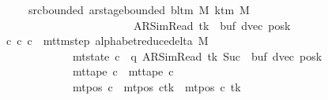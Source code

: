 \begin{isabellebody}
\ \ \ \ \ \ \ src{\isacharunderscore}{\kern0pt}bounded{\isacharcolon}{\kern0pt}\ {\isachardoublequoteopen}ar{\isacharunderscore}{\kern0pt}stage{\isacharunderscore}{\kern0pt}bounded\ {\isacharparenleft}{\kern0pt}bl{\isacharunderscore}{\kern0pt}tm\ M{\isacharparenright}{\kern0pt}\ {\isacharparenleft}{\kern0pt}k{\isacharunderscore}{\kern0pt}tm\ M{\isacharparenright}{\kern0pt}\isanewline
\ \ \ \ \ \ \ \ \ \ \ \ \ \ \ \ \ \ \ \ \ \ \ \ \ \ {\isacharparenleft}{\kern0pt}AR{\isacharunderscore}{\kern0pt}SimRead{\isacharcomma}{\kern0pt}\ tk{\isacharcomma}{\kern0pt}\ {}{\isacharcomma}{\kern0pt}\ buf{\isacharcomma}{\kern0pt}\ dvec{\isacharcomma}{\kern0pt}\ posk{\isacharparenright}{\kern0pt}{\isachardoublequoteclose}\isanewline
\ \ \ {\isachardoublequoteopen}{\isasymexists}c{\isacharprime}{\kern0pt}{\isacharprime}{\kern0pt}{\isachardot}{\kern0pt}\ {\isacharparenleft}{\kern0pt}c{\isacharprime}{\kern0pt}{\isacharcomma}{\kern0pt}\ c{\isacharprime}{\kern0pt}{\isacharprime}{\kern0pt}{\isacharparenright}{\kern0pt}\ {\isasymin}\ mttm{\isacharunderscore}{\kern0pt}step\ {\isacharparenleft}{\kern0pt}alphabet{\isacharunderscore}{\kern0pt}reduce{\isacharunderscore}{\kern0pt}delta\ M{\isacharparenright}{\kern0pt}\isanewline
\ \ \ \ \ \ \ \ \ \ \ \ \ \ {\isasymand}\ mt{\isacharunderscore}{\kern0pt}state\ c{\isacharprime}{\kern0pt}{\isacharprime}{\kern0pt}\ {\isacharequal}{\kern0pt}\ {\isacharparenleft}{\kern0pt}q{\isacharcomma}{\kern0pt}\ AR{\isacharunderscore}{\kern0pt}SimRead{\isacharcomma}{\kern0pt}\ tk{\isacharcomma}{\kern0pt}\ Suc\ {}{\isacharcomma}{\kern0pt}\ buf{\isacharcomma}{\kern0pt}\ dvec{\isacharcomma}{\kern0pt}\ posk{\isacharparenright}{\kern0pt}\isanewline
\ \ \ \ \ \ \ \ \ \ \ \ \ \ {\isasymand}\ mt{\isacharunderscore}{\kern0pt}tape\ c{\isacharprime}{\kern0pt}{\isacharprime}{\kern0pt}\ {\isacharequal}{\kern0pt}\ mt{\isacharunderscore}{\kern0pt}tape\ c{\isacharprime}{\kern0pt}\isanewline
\ \ \ \ \ \ \ \ \ \ \ \ \ \ {\isasymand}\ mt{\isacharunderscore}{\kern0pt}pos\ c{\isacharprime}{\kern0pt}{\isacharprime}{\kern0pt}\ {\isacharequal}{\kern0pt}\ {\isacharparenleft}{\kern0pt}mt{\isacharunderscore}{\kern0pt}pos\ c{\isacharprime}{\kern0pt}{\isacharparenright}{\kern0pt}{\isacharparenleft}{\kern0pt}tk\ {\isacharcolon}{\kern0pt}{\isacharequal}{\kern0pt}\ mt{\isacharunderscore}{\kern0pt}pos\ c{\isacharprime}{\kern0pt}\ tk\ {\isacharminus}{\kern0pt}\ {}{\isacharparenright}{\kern0pt}{\isachardoublequoteclose}\isanewline
%
\isadelimproof
%
\endisadelimproof
%
\isatagproof
{}\isamarkupfalse%

\end{isabellebody}
